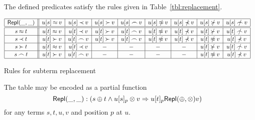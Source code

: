  \begin{LEMMA} \label{le:replacement-in-atoms} The defined predicates
satisfy the rules given in Table~\ref {tbl:replacement}.
\begin{table}[hbt]
\[\begin{array}{|c||c|c|c|c|c|c|c|c|}
\hline
 \Repl\_\_   & u[s]\Eq v  \rule{0pt}{9pt} \rule{0pt}{-2pt}  & u[s]\Incl v & u[s]\Cont v & u[s]\Int v & u[s]\notEq v & u[s]\notIncl v & u[s]\notCont v & u[s]\notInt v\\
\hline
\hline
s\Eq t \rule{0pt}{9pt} \rule{0pt}{-2pt} & u[t]\Eq v   & u[t]\Incl v & u[t]\Cont v & u[t]\Int v & u[t]\notEq v & u[t]\notIncl v & u[t]\notCont v & u[t]\notInt v\\
\hline
s\Incl t \rule{0pt}{9pt} \rule{0pt}{-2pt} & u[t]\Cont v & u[t]\Int v  & u[t]\Cont v & u[t]\Int v & u[t]\notEq v & u[t]\notIncl v & u[t]\notEq v   & u[t]\notIncl v \\
\hline
s\Cont t \rule{0pt}{9pt} \rule{0pt}{-2pt} & u[t]\Eq v   & u[t]\Incl v & -           & -          & -            & -              & u[t]\notCont v & u[t]\notInt v \\
\hline
s\Int t \rule{0pt}{9pt} \rule{0pt}{-2pt} & u[t]\Cont v & u[t]\Int v  & -           & -          & -            & -              & u[t]\notEq v   & u[t]\notIncl v \\
\hline 
\end{array}\vspace{-1ex}\]
\caption{Rules for subterm replacement} \label{tbl:replacement}
\end{table}
\end{LEMMA}
%
The table may be encoded as a partial function \[
\mbox {\sf Repl}(\_,\_): (s\oplus
t\land u[s]_p\otimes v\mathrel\Rightarrow u[t]_p \mbox {\sf Repl}(\oplus,\otimes) v)\] 
for any terms $s,t,u,v$ and position $p$ at $u$.

